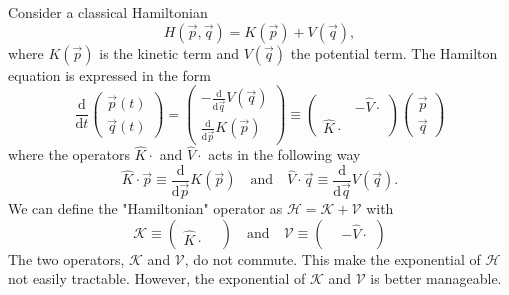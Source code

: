 Consider a classical Hamiltonian
\begin{equation}
H(\vec{p}, \vec{q}) = K(\vec{p}) + V(\vec{q}),
\end{equation}
where $K(\vec{p})$ is the kinetic term and $V(\vec{q})$ the potential term. The Hamilton equation is expressed in the form
\begin{equation}
\frac{\mathrm{d}}{\mathrm{d} t} 
\left( \begin{matrix}
\vec{p}(t) \\
\vec{q}(t)
\end{matrix} \right)
= 
\left( \begin{matrix}
- \frac{\mathrm{d}}{\mathrm{d} \vec{q}} V(\vec{q}) \\
\frac{\mathrm{d}}{\mathrm{d} \vec{p}} K(\vec{p})
\end{matrix} \right)
\equiv
\left( \begin{matrix}
 & - \hat{V} \cdot \\
\hat{K} \cdot &
\end{matrix} \right)
\left( \begin{matrix}
\vec{p} \\
\vec{q}
\end{matrix} \right)
\end{equation}
where the operators $\hat{K} \cdot$ and $\hat{V} \cdot$ acts in the following way
\begin{equation}
\hat{K} \cdot \vec{p} \equiv \frac{\mathrm{d}}{\mathrm{d} \vec{p}} K(\vec{p}) \quad \mathrm{and} \quad \hat{V} \cdot \vec{q} \equiv \frac{\mathrm{d}}{\mathrm{d} \vec{q}} V(\vec{q}).
\end{equation}
We can define the "Hamiltonian" operator as $\mathcal{H} = \mathcal{K} + \mathcal{V}$ with
\begin{equation}
\mathcal{K} \equiv \left( \begin{matrix}
 &  \\
\hat{K} \cdot &
\end{matrix} \right)
\quad \mathrm{and} \quad
\mathcal{V} \equiv \left( \begin{matrix}
 &  -\hat{V} \cdot \\
 &
\end{matrix} \right)
\end{equation}
The two operators, $\mathcal{K}$ and $\mathcal{V}$, do not commute. This make the exponential of $\mathcal{H}$ not easily tractable. However, the exponential of  $\mathcal{K}$ and $\mathcal{V}$ is better manageable.


